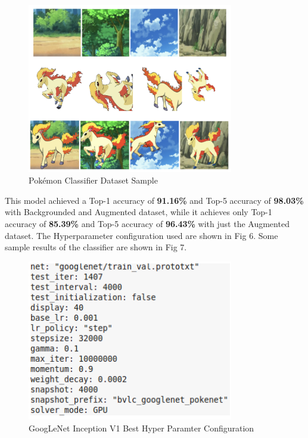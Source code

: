 \documentclass[journal, a4paper]{IEEEtran}
\begin{document}
\begin{figure}[ht]
    \caption{Pok\'emon Classifier Dataset Sample}
\centering
 \includegraphics[scale = 0.6, width=9cm]{poke_data.png}
    \end{figure}

This model achieved a Top-1 accuracy of \textbf{91.16\%} and Top-5 accuracy of \textbf{98.03\%} with Backgrounded and Augmented dataset, while it achieves only Top-1 accuracy of \textbf{85.39\%} and Top-5 accuracy of \textbf{96.43\%} with just the Augmented dataset. The Hyperparameter configuration used are shown in Fig 6. Some sample results of the classifier are shown in Fig 7.

\begin{figure}[ht]
    \caption{GoogLeNet Inception V1 Best Hyper Paramter Configuration}
\centering
 \includegraphics[scale = 0.6, width=9cm]{cnn4.png}
    \end{figure}
\end{document}
